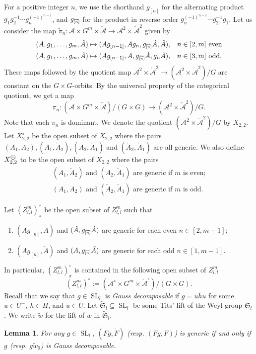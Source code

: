 \documentclass{amsart}
\newtheorem{lemma}[theorem]{Lemma}
\theoremstyle{definition}
\theoremstyle{remark}
\numberwithin{equation}{section}
\DeclareMathOperator{\SL}{SL}
\newcommand{\mc}[1]{\mathcal{#1}}
\newcommand{\mf}[1]{\mathfrak{#1}}
\newcommand{\mch}[1]{\check{\mathcal{#1}}}
\newcommand{\br}[1]{\overline{#1}}
\newcommand{\wtd}[1]{\widetilde{#1}}
\newcommand{\zllm}{{Z_{l,l}^m}}
\newcommand{\invint}[1]{{\scriptsize \overleftarrow{[#1]}}}
\newcommand{\circm}{{\mathop{\text{\textcircled{\tiny \textit m}}}\nolimits}}
\begin{document}
For a positive integer $n$, we use the shorthand $g_{[n]}$ for the alternating product $g_1g_2^{-1}\cdots g_n^{(-1)^{n-1}}$,
and $g_{\invint{n}}$ for the product in reverse order $g_n^{(-1)^{n-1}} \cdots g_2^{-1}g_1$.
Let us consider the map $\wtd{\pi}_n:\mc{A}\times G^m\times \mch{A} \to \mc{A}^2\times \mch{A}^2$ given by 
\begin{align} \label{eq:pieven} (A,g_1,\dots,g_m,\check{A})&\mapsto (Ag_{[n-1]},Ag_n,g_{\invint{n}}\check{A},\check{A}), && n\in [2,m] \text{ even}\\
\label{eq:piodd} (A,g_1,\dots,g_m, \check{A})&\mapsto (Ag_{[n-1]},A,g_{\invint{n}}\check{A},g_n\check{A}), && n\in [3,m] \text{ odd}.
 \end{align}  
These maps followed by the quotient map $\mc{A}^2\times \mch{A}^2\to (\mc{A}^2 \times \mch{A}^2 )/{G}$ are constant on the $G\times G$-orbits.
By the universal property of the categorical quotient, we get a map
\begin{equation} \label{eq:pi} \pi_{n}: (\mc{A} \times G^m \times \mch{A} )/{(G\times G)}\to (\mc{A}^2 \times \mch{A}^2 )/{G}.\end{equation}
Note that each $\pi_n$ is dominant.
We denote the quotient $(\mc{A}^2 \times \mch{A}^2 )/{G}$ by $X_{2,2}$.
Let $X_{2,2}^\circ$ be the open subset of $X_{2,2}$ where the pairs $(A_1,{A}_2),(A_1,\check{A}_2),(A_2,\check{A}_1)$ and $(\check{A}_2,\check{A}_1)$ are all generic.
We also define $X_{2,2}^{\circm}$ to be the open subset of $X_{2,2}$ where the pairs 
\begin{align*}
\text{$(A_1,\check{A}_2)$ and $(A_2,\check{A}_1)$ are generic if $m$ is even;}\\
\text{$(A_1,{A}_2)$ and $(\check{A}_2,\check{A}_1)$ are generic if $m$ is odd.}
\end{align*}



Let $(\zllm)^{\circ}_\pi$ be the open subset of $\zllm$ such that
\begin{enumerate}
\item[] $(Ag_{[n]},A)$ and $(\check{A},g_{\invint{n}}\check{A})$ are generic for each even $n\in[2,m-1]$; 
\item[] $(Ag_{[n]},\check{A})$ and $(A,g_{\invint{n}}\check{A})$ are generic for each odd $n\in[1,m-1]$.
\end{enumerate}
In particular, $(\zllm)^{\circ}_\pi$ is contained in the following open subset of $\zllm$ 
$$(\zllm)^\circ:=(\mc{A}^\circ \times G^m \times \mch{A}^\circ)/{(G\times G)}.$$
Recall that we say that $g\in \SL_l$ is {\em Gauss decomposable} if $g=\br{u}hu$ for some $\br{u}\in U^-,\ h\in H$, and $u\in U$. 
Let $\wtd{\mf{S}}_l\subseteq \SL_l$ be some Tits' lift of the Weyl group $\mf{S}_l$.
We write $\wtd{w}$ for the lift of $w$ in $\wtd{\mf{S}}_l$.
\begin{lemma} \label{L:Gauss} For any $g\in\SL_l$, $(Fg,\check{F})$ (resp. $(Fg,F)$) is generic if and only if $g$ (resp. $g\wtd{w}_0$) is Gauss decomposable. 
\end{lemma}
\end{document}
